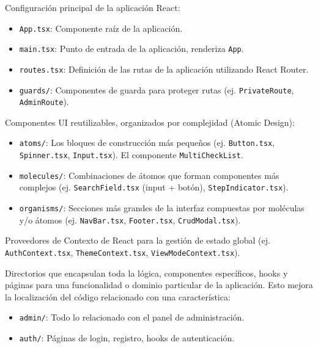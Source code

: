 \begin{description}[leftmargin=*,style=unboxed,font=\normalfont]
  \item[\texttt{src/app/}] Configuración principal de la aplicación React:
    \begin{itemize}
        \item \texttt{App.tsx}: Componente raíz de la aplicación.
        \item \texttt{main.tsx}: Punto de entrada de la aplicación, renderiza \texttt{App}.
        \item \texttt{routes.tsx}: Definición de las rutas de la aplicación utilizando React Router.
        \item \texttt{guards/}: Componentes de guarda para proteger rutas (ej. \texttt{PrivateRoute}, \texttt{AdminRoute}).
    \end{itemize}
  \item[\texttt{src/components/}] Componentes UI reutilizables, organizados por complejidad (Atomic Design):
    \begin{itemize}
        \item \texttt{atoms/}: Los bloques de construcción más pequeños (ej. \texttt{Button.tsx}, \texttt{Spinner.tsx}, \texttt{Input.tsx}). El componente \texttt{MultiCheckList}.
        \item \texttt{molecules/}: Combinaciones de átomos que forman componentes más complejos (ej. \texttt{SearchField.tsx} (input + botón), \texttt{StepIndicator.tsx}).
        \item \texttt{organisms/}: Secciones más grandes de la interfaz compuestas por moléculas y/o átomos (ej. \texttt{NavBar.tsx}, \texttt{Footer.tsx}, \texttt{CrudModal.tsx}).
    \end{itemize}
  \item[\texttt{src/context/}] Proveedores de Contexto de React para la gestión de estado global (ej. \texttt{AuthContext.tsx}, \texttt{ThemeContext.tsx}, \texttt{ViewModeContext.tsx}).
  \item[\texttt{src/features/}] Directorios que encapsulan toda la lógica, componentes específicos, hooks y páginas para una funcionalidad o dominio particular de la aplicación. Esto mejora la localización del código relacionado con una característica:
    \begin{itemize}
        \item \texttt{admin/}: Todo lo relacionado con el panel de administración.
        \item \texttt{auth/}: Páginas de login, registro, hooks de autenticación.

\end{itemize}
\end{description}
